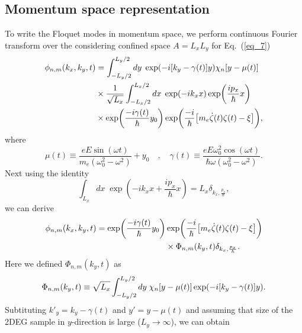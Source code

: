 \subsection{Momentum space representation}

To write the Floquet modes in momentum space, we perform continuous Fourier transform over the considering confined space $A=L_xL_y$ for Eq.~(\ref{eq_7})
\begin{equation} \label{eq_b8}
  \begin{aligned}
    \phi_{n,m}(k_x,k_y,t)  &=
    \int_{-L_y/2}^{L_y/2} dy\; \exp(-i\qty[k_y - \gamma(t)]y)
    \chi_{n}\qty[y - \mu(t)] \\
     & \times
     \frac{1}{\sqrt{L_x}}
     \int_{-L_x/2}^{L_x/2} dx\;
     \exp(-ik_x x)
     \exp( \frac{i p_x }{\hbar}x ) \\
     &
     \times
     \exp(
      \frac{-i\gamma(t)}{\hbar}
      y_0)
     \exp(\frac{-i}{\hbar}
     \qty[
     m_e \dot{\zeta}(t) \zeta(t) - \xi
     ]),
  \end{aligned}
\end{equation}
where
\begin{equation} \label{eq_b9}
  \mu(t) \equiv \frac{eE\sin(\omega t)}{m_e(\omega_0^2 - \omega^2)} + y_0
  \quad,\quad
  \gamma(t) \equiv
  \frac{eE\omega_0^2\cos(\omega t)}{\hbar\omega(\omega_0^2 - \omega^2)}.
\end{equation}
Next using the identity \cite{bruus04}
\begin{equation} \label{eq_b10}
  \int_{L_x} dx\;
  \exp( -ik_x x + \frac{i p_x }{\hbar}x ) =
  L_x \delta_{k_x,\frac{p_x}{\hbar}},
\end{equation}
we can derive
\begin{equation} \label{eq_b11}
  \begin{aligned}
    \phi_{n,m}(k_x,k_y,t)  =
    \exp(
     \frac{-i\gamma(t)}{\hbar}
     y_0) &
    \exp(\frac{-i}{\hbar}
    \qty[
    m_e \dot{\zeta}(t) \zeta(t) - \xi
    ]) \\
    & \times
    \Phi_{n,m}(k_y,t)
    \delta_{k_x,\frac{p_x}{\hbar}}.
  \end{aligned}
\end{equation}
Here we defined $\Phi_{n,m}(k_y,t)$ as
\begin{equation} \label{eq_b12}
  \Phi_{n,m}(k_y,t) \equiv
  \sqrt{L_x}
  \int_{-L_y/2}^{L_y/2} dy\;
  \chi_{n}\qty[y - \mu(t)]
  \exp(
    -i\qty[k_y - \gamma(t)]
    y).
\end{equation}
Subtituting $  {k'_y} = k_y -\gamma(t)$ and $y' = y -\mu(t)$ and assuming that size of the 2DEG sample in $y$-direction is large ($L_y \rightarrow \infty$), we can obtain
